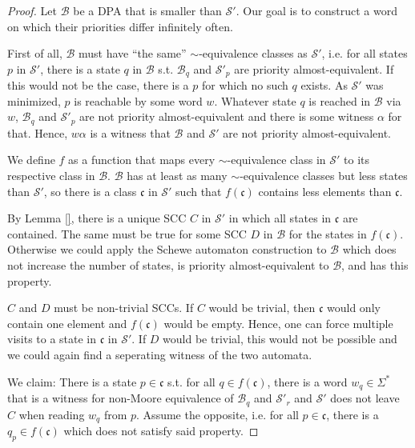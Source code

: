\begin{proof}
	Let $\mathcal{B}$ be a DPA that is smaller than $\mathcal{S}'$. Our goal is to construct a word on which their priorities differ infinitely often.
	
	First of all, $\mathcal{B}$ must have \enquote{the same} $\sim$-equivalence classes as $\mathcal{S}'$, i.e. for all states $p$ in $\mathcal{S}'$, there is a state $q$ in $\mathcal{B}$ s.t. $\mathcal{B}_q$ and $\mathcal{S}'_p$ are priority almost-equivalent. If this would not be the case, there is a $p$ for which no such $q$ exists. As $\mathcal{S}'$ was minimized, $p$ is reachable by some word $w$. Whatever state $q$ is reached in $\mathcal{B}$ via $w$, $\mathcal{B}_q$ and $\mathcal{S}'_p$ are not priority almost-equivalent and there is some witness $\alpha$ for that. Hence, $w \alpha$ is a witness that $\mathcal{B}$ and $\mathcal{S}'$ are not priority almost-equivalent.
	
	We define $f$ as a function that maps every $\sim$-equivalence class in $\mathcal{S}'$ to its respective class in $\mathcal{B}$. $\mathcal{B}$ has at least as many $\sim$-equivalence classes but less states than $\mathcal{S}'$, so there is a class $\mathfrak{c}$ in $\mathcal{S}'$ such that $f(\mathfrak{c})$ contains less elements than $\mathfrak{c}$.
	
	By Lemma \ref{}, there is a unique SCC $C$ in $\mathcal{S}'$ in which all states in $\mathfrak{c}$ are contained. The same must be true for some SCC $D$ in $\mathcal{B}$ for the states in $f(\mathfrak{c})$. Otherwise we could apply the Schewe automaton construction to $\mathcal{B}$ which does not increase the number of states, is priority almost-equivalent to $\mathcal{B}$, and has this property.
	
	$C$ and $D$ must be non-trivial SCCs. If $C$ would be trivial, then $\mathfrak{c}$ would only contain one element and $f(\mathfrak{c})$ would be empty. Hence, one can force multiple visits to a state in $\mathfrak{c}$ in $\mathcal{S}'$. If $D$ would be trivial, this would not be possible and we could again find a seperating witness of the two automata.
	
	We claim: There is a state $p \in \mathfrak{c}$ s.t. for all $q \in f(\mathfrak{c})$, there is a word $w_q \in \Sigma^*$ that is a witness for non-Moore equivalence of $\mathcal{B}_q$ and $\mathcal{S}'_r$ and $\mathcal{S}'$ does not leave $C$ when reading $w_q$ from $p$. Assume the opposite, i.e. for all $p \in \mathfrak{c}$, there is a $q_p \in f(\mathfrak{c})$ which does not satisfy said property. 
	

\end{proof}
